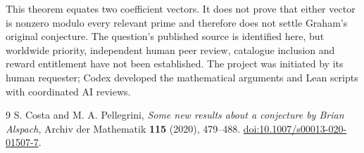 \documentclass[11pt]{article}
\begin{document}
This theorem equates two coefficient vectors. It does not prove that
either vector is nonzero modulo every relevant prime and therefore does
not settle Graham's original conjecture. The question's published source
is identified here, but worldwide priority, independent human peer review,
catalogue inclusion and reward entitlement have not been established.
The project was initiated by its human requester; Codex developed the
mathematical arguments and Lean scripts with coordinated AI reviews.

\begin{thebibliography}{9}
 S. Costa and M. A. Pellegrini,
\emph{Some new results about a conjecture by Brian Alspach},
Archiv der Mathematik \textbf{115} (2020), 479--488.
\href{https://doi.org/10.1007/s00013-020-01507-7}{doi:10.1007/s00013-020-01507-7}.
\end{thebibliography}
\end{document}
